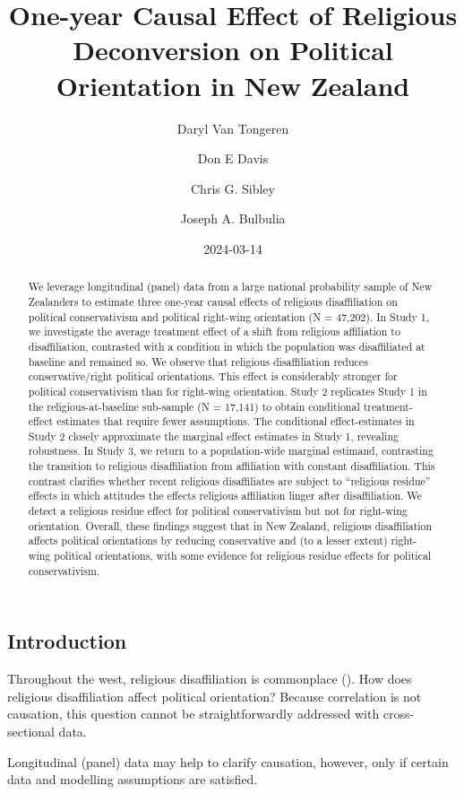 \documentclass[
  singlecolumn]{article}
\title{One-year Causal Effect of Religious Deconversion on Political
Orientation in New Zealand}
\author{Daryl Van Tongeren \and Don E Davis \and Chris G.
Sibley \and Joseph A. Bulbulia}
\date{2024-03-14}
\begin{document}
\maketitle
\begin{abstract}
We leverage longitudinal (panel) data from a large national probability
sample of New Zealanders to estimate three one-year causal effects of
religious disaffiliation on political conservativism and political
right-wing orientation (N = 47,202). In Study 1, we investigate the
average treatment effect of a shift from religious affiliation to
disaffiliation, contrasted with a condition in which the population was
disaffiliated at baseline and remained so. We observe that religious
disaffiliation reduces conservative/right political orientations. This
effect is considerably stronger for political conservativism than for
right-wing orientation. Study 2 replicates Study 1 in the
religious-at-baseline sub-sample (N = 17,141) to obtain conditional
treatment-effect estimates that require fewer assumptions. The
conditional effect-estimates in Study 2 closely approximate the marginal
effect estimates in Study 1, revealing robustness. In Study 3, we return
to a population-wide marginal estimand, contrasting the transition to
religious disaffiliation from affiliation with constant disaffiliation.
This contrast clarifies whether recent religious disaffiliates are
subject to ``religious residue'' effects in which attitudes the effects
religious affiliation linger after disaffiliation. We detect a religious
residue effect for political conservativism but not for right-wing
orientation. Overall, these findings suggest that in New Zealand,
religious disaffiliation affects political orientations by reducing
conservative and (to a lesser extent) right-wing political orientations,
with some evidence for religious residue effects for political
conservativism.
\end{abstract}

\subsection{Introduction}\label{introduction}

Throughout the west, religious disaffiliation is commonplace
(). How
does religious disaffiliation affect political orientation? Because
correlation is not causation, this question cannot be straightforwardly
addressed with cross-sectional data.

Longitudinal (panel) data may help to clarify causation, however, only
if certain data and modelling assumptions are satisfied.
\end{document}
